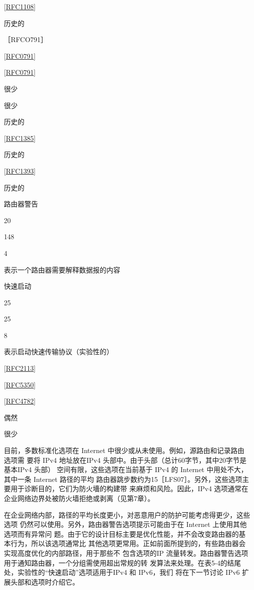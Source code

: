 \href{https://www.rfc-editor.org/rfc/rfc1108}{[RFC1108]}

历史的

［RFCO791］

\href{https://www.rfc-editor.org/rfc/rfc0791}{[RFC0791]}

\href{https://www.rfc-editor.org/rfc/rfc0791}{[RFC0791]}

很少

很少

历史的

\href{https://www.rfc-editor.org/rfc/rfc1385}{[RFC1385]}

历史的

\href{https://www.rfc-editor.org/rfc/rfc1393}{[RFC1393]}

历史的

路由器警告

20

148

4

表示一个路由器需要解释数据报的内容

快速启动

25

25

8

表示启动快速传输协议（实验性的）

\href{https://www.rfc-editor.org/rfc/rfc2113}{[RFC2113]}

\href{https://www.rfc-editor.org/rfc/rfc5350}{[RFC5350]}

\href{https://www.rfc-editor.org/rfc/rfc4782}{[RFC4782]}

偶然

很少

目前，多数标准化选项在 Internet 中很少或从未使用。例如，源路由和记录路由选项需
要将 IPv4 地址放在IPv4 头部中。由于头部（总计60字节，其中20字节是基本IPv4 头部）
空间有限，这些选项在当前基于 IPv4 的 Internet 中用处不大，其中一条 Internet 路径的平均
路由器跳步数约为15［LFS07］。另外，这些选项主要用于诊断目的，它们为防火墻的构建带
来麻烦和风险。因此，IPv4 选项通常在企业网络边界处被防火墙拒绝或剥离（见第7章）。

在企业网络内部，路径的平均长度更小，对恶意用户的防护可能考虑得更少，这些选项
仍然可以使用。另外，路由器警告选项提示可能由于在 Internet 上使用其他选项而有异常问
题。由于它的设计目标主要是优化性能，并不会改变路由器的基本行为，所以该选项通常比
其他选项更常用。正如前面所提到的，有些路由器会实现高度优化的内部路径，用于那些不
包含选项的IP 流量转发。路由器警告选项用于通知路由器，一个分组需使用超出常规的转
发算法来处理。在表5-4的结尾处，实验性的“快速启动”选项适用于IPv4 和 IPv6，我们
将在下一节讨论 IPv6 扩展头部和选项时介绍它。


